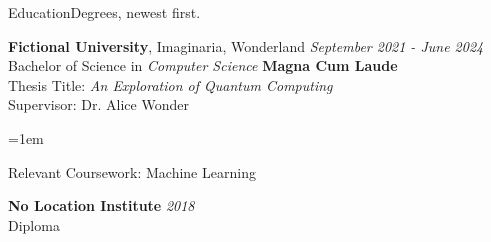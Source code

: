 \documentclass{resume}
\begin{document}
    \begin{rSection}{Education}Degrees, newest first.\par
    
    {\textbf{Fictional University}, Imaginaria, Wonderland} \hfill {\em September 2021 - June 2024} 
    \\ Bachelor of Science in \textit{Computer Science} \hfill \textbf{Magna Cum Laude}\\ Thesis Title: \textit{An Exploration of Quantum Computing}\\ Supervisor: Dr. Alice Wonder\begin{list}{\textbullet}{\leftmargin=1em}
        \setlength{\itemsep}{-0.5em} \vspace{-0.5em}\item Relevant Coursework: Machine Learning\end{list}\medskip
    
    {\textbf{No Location Institute}} \hfill {\em 2018} 
    \\ Diploma \hfill \medskip
    
    \end{rSection}
\end{document}
